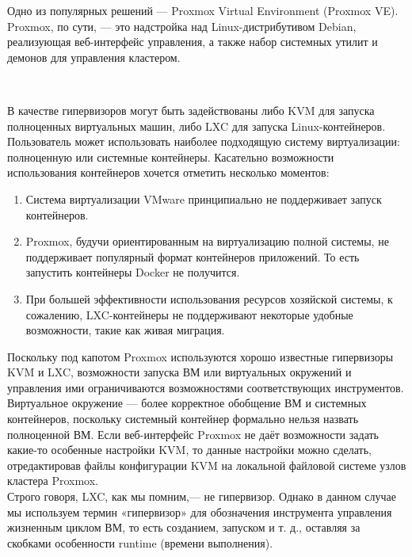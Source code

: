 \documentclass[14pt, a4paper]{article}
\begin{document}
Одно из популярных решений — Proxmox Virtual Environment (Proxmox VE). Proxmox, по сути, — это
надстройка над Linux-дистрибутивом Debian, реализующая веб-интерфейс управления, а также набор
системных утилит и демонов для управления кластером.

\newpage

\begin{figure}[h]
    \centering
    \\ 
    \label{framework} 
\end{figure}

В качестве гипервизоров могут быть задействованы либо KVM для запуска полноценных виртуальных
машин, либо LXC для запуска Linux-контейнеров. Пользователь может использовать наиболее
подходящую систему виртуализации: полноценную или системные контейнеры. Касательно
возможности использования контейнеров хочется отметить несколько моментов:
\begin{enumerate}
    \item Система виртуализации VMware принципиально не поддерживает запуск контейнеров.
    \item Proxmox, будучи ориентированным на виртуализацию полной системы, не поддерживает
    популярный формат контейнеров приложений. То есть запустить контейнеры Docker не
    получится.
    \item При большей эффективности использования ресурсов хозяйской системы, к сожалению,
    LXC-контейнеры не поддерживают некоторые удобные возможности, такие как живая
    миграция.
\end{enumerate}

Поскольку под капотом Proxmox используются хорошо известные гипервизоры KVM и LXC,
возможности запуска ВМ или виртуальных окружений и управления ими ограничиваются
возможностями соответствующих инструментов. Виртуальное окружение — более корректное
обобщение ВМ и системных контейнеров, поскольку системный контейнер формально нельзя назвать
полноценной ВМ. Если веб-интерфейс Proxmox не даёт возможности задать какие-то особенные
настройки KVM, то данные настройки можно сделать, отредактировав файлы конфигурации KVM на
локальной файловой системе узлов кластера Proxmox.\\

Строго говоря, LXC, как мы помним,— не гипервизор. Однако в данном случае мы используем термин
«гипервизор» для обозначения инструмента управления жизненным циклом ВМ, то есть созданием,
запуском и т. д., оставляя за скобками особенности runtime (времени выполнения).\\
\end{document}
